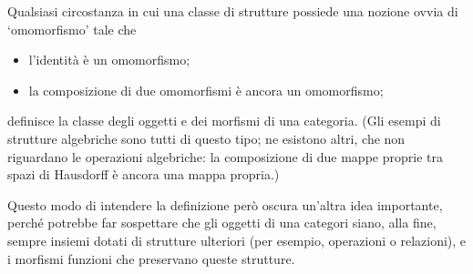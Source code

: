 Qualsiasi circostanza in cui una classe di strutture possiede una nozione ovvia di `omomorfismo' tale che
\begin{itemize}
    \item l'identità è un omomorfismo;
    \item la composizione di due omomorfismi è ancora un omomorfismo;
\end{itemize}
definisce la classe degli oggetti e dei morfismi di una categoria. (Gli esempi di strutture algebriche sono tutti di questo tipo; ne esistono altri, che non riguardano le operazioni algebriche: la composizione di due mappe proprie tra spazi di Hausdorff è ancora una mappa propria.)

Questo modo di intendere la definizione però oscura un'altra idea importante, perché potrebbe far sospettare che gli oggetti di una categori siano, alla fine, sempre insiemi dotati di strutture ulteriori (per esempio, operazioni o relazioni), e i morfismi funzioni che preservano queste strutture.

